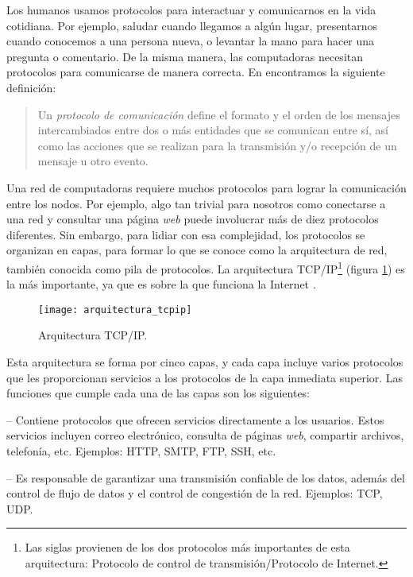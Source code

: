 \label{sec:protocolos_de_comunicacion_y_arquitectura_de_red}

Los humanos usamos protocolos para interactuar y comunicarnos en la vida
cotidiana. Por ejemplo, saludar cuando llegamos a algún lugar, presentarnos
cuando conocemos a una persona nueva, o levantar la mano para hacer una pregunta
o comentario. De la misma manera, las computadoras necesitan protocolos para
comunicarse de manera correcta. En \cite{Kurose2013} encontramos la siguiente
definición:

\begin{quotation}
Un \textit{protocolo de comunicación} define el formato y el orden de los
mensajes intercambiados entre dos o más entidades que se comunican entre sí,
así como las acciones que se realizan para la transmisión y/o recepción de un
mensaje u otro \mbox{evento}.
\end{quotation}

Una red de computadoras requiere muchos protocolos para lograr la comunicación
entre los nodos. Por ejemplo, algo tan trivial para nosotros como conectarse a
una red y consultar una página \textit{web} puede involucrar más de diez
protocolos diferentes. Sin embargo, para lidiar con esa complejidad, los
protocolos se organizan en capas, para formar lo que se conoce como la
arquitectura de red, también conocida como pila de protocolos. La arquitectura
TCP/IP\footnote{Las siglas provienen de los dos protocolos más importantes de
esta arquitectura: Protocolo de control de transmisión/Protocolo de Internet.}
(figura \ref{fig:arquitectura_tcpip}) es la más importante, ya que es sobre la
que funciona la Internet \cite{Kurose2013}.

\begin{figure}[th]
\centering
\texttt{[image: arquitectura\_tcpip]}
\decoRule
\caption[Arquitectura TCP/IP]{Arquitectura TCP/IP.}
\label{fig:arquitectura_tcpip}
\end{figure}

Esta arquitectura se forma por cinco capas, y cada capa incluye varios
protocolos que les proporcionan servicios a los protocolos de la capa inmediata
superior. Las funciones que cumple cada una de las capas son los siguientes:

 -- Contiene protocolos que ofrecen servicios
directamente a los usuarios. Estos servicios incluyen correo electrónico,
consulta de páginas \textit{web}, compartir archivos, telefonía, etc. Ejemplos:
HTTP, SMTP, FTP, SSH, etc.

 -- Es responsable de garantizar una transmisión
confiable de los datos, además del control de flujo de datos y el control de
congestión de la red. Ejemplos: TCP, UDP.

